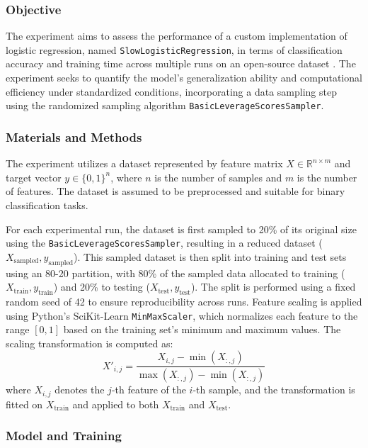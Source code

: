 \documentclass{article}
\theoremstyle{plain}
\theoremstyle{definition}
\theoremstyle{remark}
\begin{document}
\subsubsection{Objective}

The experiment aims to assess the performance of a custom implementation of logistic regression, named \texttt{SlowLogisticRegression}, in terms of classification accuracy and training time across multiple runs on an open-source dataset \cite{breastcancer}. The experiment seeks to quantify the model's generalization ability and computational efficiency under standardized conditions, incorporating a data sampling step using the randomized sampling algorithm \texttt{BasicLeverageScoresSampler}.


\subsubsection{Materials and Methods}

The experiment utilizes a dataset represented by feature matrix $ X \in \mathbb{R}^{n \times m} $ and target vector $ y \in \{0, 1\}^n $, where $ n $ is the number of samples and $ m $ is the number of features. The dataset is assumed to be preprocessed and suitable for binary classification tasks.

For each experimental run, the dataset is first sampled to 20\% of its original size using the \texttt{BasicLeverageScoresSampler}, resulting in a reduced dataset ($ X_{\text{sampled}}, y_{\text{sampled}} $). This sampled dataset is then split into training and test sets using an 80-20 partition, with 80\% of the sampled data allocated to training ($ X_{\text{train}}, y_{\text{train}} $) and 20\% to testing ($ X_{\text{test}}, y_{\text{test}} $). The split is performed using a fixed random seed of 42 to ensure reproducibility across runs. Feature scaling is applied using Python's SciKit-Learn \texttt{MinMaxScaler}, which normalizes each feature to the range $[0, 1]$ based on the training set's minimum and maximum values. The scaling transformation is computed as:
\[
X'_{i,j} = \frac{X_{i,j} - \min(X_{:,j})}{\max(X_{:,j}) - \min(X_{:,j})}
\]
where $ X_{i,j} $ denotes the $ j $-th feature of the $ i $-th sample, and the transformation is fitted on $ X_{\text{train}} $ and applied to both $ X_{\text{train}} $ and $ X_{\text{test}} $.

\subsubsection{Model and Training}
\end{document}
